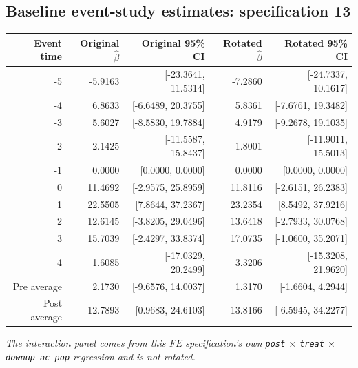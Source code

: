 \documentclass[10pt]{article}
\begin{document}
\subsection*{Baseline event-study estimates: specification 13}
\begin{center}
\scriptsize
\begin{tabular}{r rr rr}
\toprule
Event time & Original $\hat\beta$ & Original 95\% CI & Rotated $\hat\beta$ & Rotated 95\% CI \\
\midrule
-5 & -5.9163 & [-23.3641, 11.5314] & -7.2860 & [-24.7337, 10.1617] \\
-4 & 6.8633 & [-6.6489, 20.3755] & 5.8361 & [-7.6761, 19.3482] \\
-3 & 5.6027 & [-8.5830, 19.7884] & 4.9179 & [-9.2678, 19.1035] \\
-2 & 2.1425 & [-11.5587, 15.8437] & 1.8001 & [-11.9011, 15.5013] \\
-1 & 0.0000 & [0.0000, 0.0000] & 0.0000 & [0.0000, 0.0000] \\
0 & 11.4692 & [-2.9575, 25.8959] & 11.8116 & [-2.6151, 26.2383] \\
1 & 22.5505 & [7.8644, 37.2367] & 23.2354 & [8.5492, 37.9216] \\
2 & 12.6145 & [-3.8205, 29.0496] & 13.6418 & [-2.7933, 30.0768] \\
3 & 15.7039 & [-2.4297, 33.8374] & 17.0735 & [-1.0600, 35.2071] \\
4 & 1.6085 & [-17.0329, 20.2499] & 3.3206 & [-15.3208, 21.9620] \\
\midrule
Pre average & 2.1730 & [-9.6576, 14.0037] & 1.3170 & [-1.6604, 4.2944] \\
Post average & 12.7893 & [0.9683, 24.6103] & 13.8166 & [-6.5945, 34.2277] \\
\bottomrule
\end{tabular}
\end{center}
\medskip
\textit{The interaction panel comes from this FE specification's own \texttt{post} $\times$ \texttt{treat} $\times$ \texttt{downup\_ac\_pop} regression and is not rotated.}
\clearpage
\end{document}
